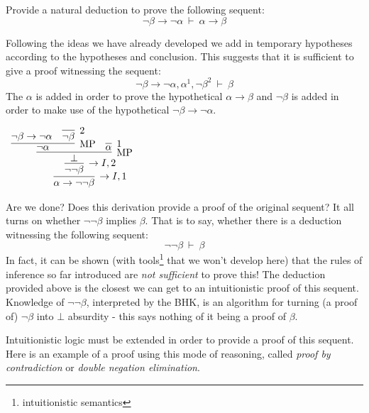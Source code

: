 \documentclass{book}
\begin{document}
    \begin{eg}
        Provide a natural deduction to prove the following sequent: $$\lnot\beta \to \lnot\alpha \ \vdash \ \alpha \to \beta$$

        Following the ideas we have already developed we add in temporary hypotheses according to the hypotheses and conclusion. This suggests that it is sufficient to give a proof witnessing the sequent: $$\lnot\beta \to \lnot\alpha, \alpha^{1}, \lnot\beta^{2} \ \vdash \ \beta$$ The $\alpha$ is added in order to prove the hypothetical $\alpha\to\beta$ and $\lnot\beta$ is added in order to make use of the hypothetical $\lnot\beta\to\lnot\alpha$. 

        \begin{center}
            $\begin{array}{c}
                \infer[\to I,1]{\alpha \to \lnot\lnot\beta}
                    {\infer[\to I,2]{\lnot\lnot\beta}
                        {\infer[\MP]{\bot}
                            {\infer[\MP]{\lnot\alpha}
                                {\lnot\beta \to \lnot\alpha
                                &
                                \infer[2]{\lnot\beta}
                                    {}}
                            &
                            \infer[1]{\alpha}
                                {}}}}
            \end{array}$
        \end{center}
    \end{eg}

    Are we done? Does this derivation provide a proof of the original sequent? It all turns on whether $\lnot\lnot\beta$ implies $\beta$. That is to say, whether there is a deduction witnessing the following sequent: $$\lnot\lnot\beta \ \vdash \ \beta$$ In fact, it can be shown (with tools\footnote{intuitionistic semantics} that we won't develop here) that the rules of inference so far introduced are \emph{not sufficient} to prove this! The deduction provided above is the closest we can get to an intuitionistic proof of this sequent. Knowledge of $\lnot\lnot\beta$, interpreted by the BHK, is an algorithm for turning (a proof of) $\lnot\beta$ into $\bot$ absurdity - this says nothing of it being a proof of $\beta$.

    Intuitionistic logic must be extended in order to provide a proof of this sequent. Here is an example of a proof using this mode of reasoning, called \emph{proof by contradiction} or \emph{double negation elimination}.
\end{document}
